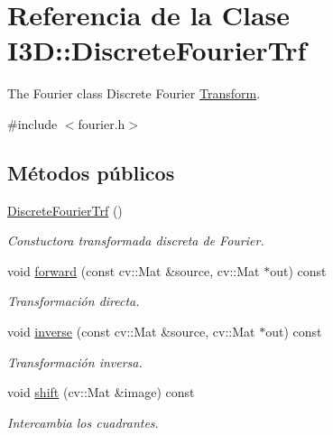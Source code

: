 \hypertarget{class_i3_d_1_1_discrete_fourier_trf}{}\section{Referencia de la Clase I3D\+:\+:Discrete\+Fourier\+Trf}
\label{class_i3_d_1_1_discrete_fourier_trf}


The Fourier class Discrete Fourier \hyperlink{class_i3_d_1_1_transform}{Transform}.  




{\ttfamily \#include $<$fourier.\+h$>$}

\subsection*{Métodos públicos}
\begin{DoxyCompactItemize}
\item 
\hyperlink{class_i3_d_1_1_discrete_fourier_trf_af2a71fc09dd90202fde0c7681d60843c}{Discrete\+Fourier\+Trf} ()
\begin{DoxyCompactList}\small\item\em Constuctora transformada discreta de Fourier. \end{DoxyCompactList}\item 
void \hyperlink{class_i3_d_1_1_discrete_fourier_trf_a75654523e5a83d416e5aa2caa575bb69}{forward} (const cv\+::\+Mat \&source, cv\+::\+Mat $\ast$out) const 
\begin{DoxyCompactList}\small\item\em Transformación directa. \end{DoxyCompactList}\item 
void \hyperlink{class_i3_d_1_1_discrete_fourier_trf_aa6f6a2e71d2dc2b5b3beca65913416a0}{inverse} (const cv\+::\+Mat \&source, cv\+::\+Mat $\ast$out) const 
\begin{DoxyCompactList}\small\item\em Transformación inversa. \end{DoxyCompactList}\item 
void \hyperlink{class_i3_d_1_1_discrete_fourier_trf_ae9a5042d59d049325adc7fcc046b7a0e}{shift} (cv\+::\+Mat \&image) const 
\begin{DoxyCompactList}\small\item\em Intercambia los cuadrantes. \end{DoxyCompactList}\end{DoxyCompactItemize}


